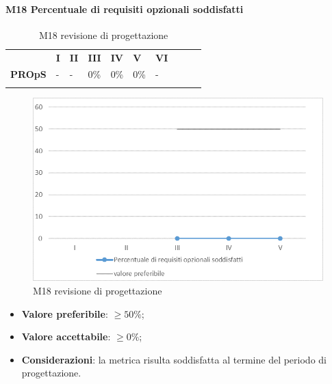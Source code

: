 \paragraph{M18 Percentuale di requisiti opzionali soddisfatti} \mbox{}
\begin{longtable}[H!] {						
		>{}p{50mm}  		
		>{}p{8mm}
		>{}p{8mm}		
		>{}p{8mm}		
		>{}p{8mm}		
		>{}p{8mm}		
		>{}p{8mm}
		>{}p{8mm}
		>{}p{8mm}
		>{}p{8mm}
	}
	\rowcolor{gray!50}
	\textbf{} & \textbf{I} & \textbf{II} & \textbf{III} & \textbf{IV} & \textbf{V} & \textbf{VI} \TBstrut \\ [2mm]
	\textbf{PROpS} & - & - & 0\% & 0\% & 0\% & - \TBstrut \\ [2mm]
	\rowcolor{white}
	\caption{M18 revisione di progettazione}
\end{longtable}
\begin{figure}[H] 	
\includegraphics[width=\linewidth]{./img/grafici/RP15.png}	
\caption{M18 revisione di progettazione}	
\end{figure}
\begin{itemize}
	\item \textbf{Valore preferibile}: $\ge50\%$;
	\item \textbf{Valore accettabile}: $\ge0\%$;
	\item \textbf{Considerazioni}: la metrica risulta soddisfatta al termine del periodo di progettazione.
\end{itemize}
